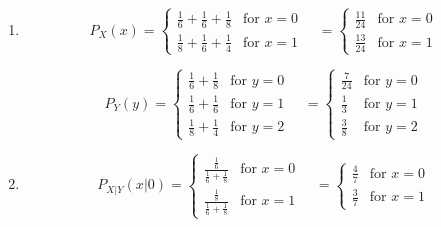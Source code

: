 \begin{problem}{13} $ $
\begin{enumerate}

\item 

	\begin{equation*}  
  P_X(x) = \begin{cases}
                                   \frac{1}{6}+\frac{1}{6}+\frac{1}{8} & \text{for $x = 0$} \\
                                   \frac{1}{8}+\frac{1}{6}+\frac{1}{4} & \text{for $x = 1$} 
       \end{cases} \quad
= \begin{cases}
                                   \frac{11}{24}& \text{for $x = 0$} \\
                                   \frac{13}{24} & \text{for $x = 1$} 
       \end{cases}
\end{equation*}

	\begin{equation*}  
  P_Y(y) = \begin{cases}
                                   \frac{1}{6}+\frac{1}{8} & \text{for $y = 0$} \\
                                   \frac{1}{6}+\frac{1}{6} & \text{for $y = 1$} \\
                                   \frac{1}{8}+\frac{1}{4} & \text{for $y = 2$} 
       \end{cases} \quad
= \begin{cases}
                                   \frac{7}{24}& \text{for $y = 0$} \\
                                   \frac{1}{3} & \text{for $y = 1$} \\
                                   \frac{3}{8} & \text{for $y = 2$} 
       \end{cases}
\end{equation*}

\item

	\begin{equation*}  
  P_{X|Y}(x|0) = \begin{cases}
                                   \frac{\frac{1}{6}}{\frac{1}{6}+\frac{1}{8}}& \text{for $x = 0$} \\
                                   \frac{\frac{1}{8}}{\frac{1}{6}+\frac{1}{8}}& \text{for $x = 1$} 
       \end{cases} \quad
= \begin{cases}
                                   \frac{4}{7}& \text{for $x = 0$} \\
                                   \frac{3}{7} & \text{for $x = 1$} 
       \end{cases}
\end{equation*}


\end{enumerate}
\end{problem}
